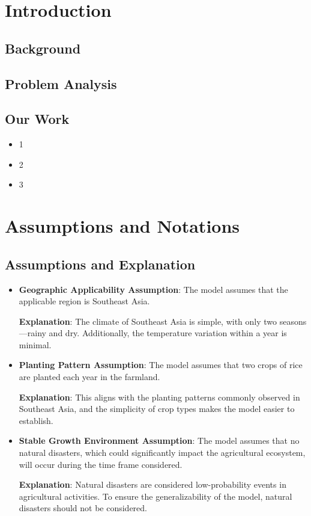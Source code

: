 \documentclass{HZNUMCM}
\begin{document}
\showSummarySheet
\showContents

  \section{Introduction}
    \subsection{Background}
    \subsection{Problem Analysis}
    \subsection{Our Work}
    \begin{itemize}
      \item 1
      \item 2
      \item 3
    \end{itemize}

  \section{Assumptions and Notations}
    \subsection{Assumptions and Explanation}
      \begin{itemize}
        \item \textbf{Geographic Applicability Assumption}: The model assumes that the applicable region is Southeast Asia.

        \textbf{Explanation}: The climate of Southeast Asia is simple, with only two seasons—rainy and dry. Additionally, the temperature variation within a year is minimal.
        \item \textbf{Planting Pattern Assumption}: The model assumes that two crops of rice are planted each year in the farmland.
  
        \textbf{Explanation}: This aligns with the planting patterns commonly observed in Southeast Asia, and the simplicity of crop types makes the model easier to establish.
        \item \textbf{Stable Growth Environment Assumption}: The model assumes that no natural disasters, which could significantly impact the agricultural ecosystem, will occur during the time frame considered.
  
        \textbf{Explanation}: Natural disasters are considered low-probability events in agricultural activities. To ensure the generalizability of the model, natural disasters should not be considered.
      \end{itemize}
\end{document}
